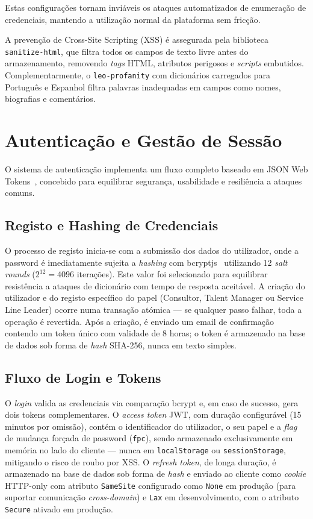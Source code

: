 \documentclass[12pt,a4paper]{report}
\begin{document}
\noindent Estas configurações tornam inviáveis os ataques automatizados de enumeração de credenciais, mantendo a utilização normal da plataforma sem fricção.

A prevenção de Cross-Site Scripting (XSS) é assegurada pela biblioteca \texttt{sanitize-html}, que filtra todos os campos de texto livre antes do armazenamento, removendo \textit{tags} HTML, atributos perigosos e \textit{scripts} embutidos. Complementarmente, o \texttt{leo-profanity} com dicionários carregados para Português e Espanhol filtra palavras inadequadas em campos como nomes, biografias e comentários.

\section{Autenticação e Gestão de Sessão}

O sistema de autenticação implementa um fluxo completo baseado em JSON Web Tokens~\cite{jwt}, concebido para equilibrar segurança, usabilidade e resiliência a ataques comuns.

\subsection{Registo e Hashing de Credenciais}

O processo de registo inicia-se com a submissão dos dados do utilizador, onde a password é imediatamente sujeita a \textit{hashing} com bcryptjs~\cite{bcrypt} utilizando 12 \textit{salt rounds} ($2^{12} = 4096$ iterações). Este valor foi selecionado para equilibrar resistência a ataques de dicionário com tempo de resposta aceitável. A criação do utilizador e do registo específico do papel (Consultor, Talent Manager ou Service Line Leader) ocorre numa transação atómica --- se qualquer passo falhar, toda a operação é revertida. Após a criação, é enviado um email de confirmação contendo um token único com validade de 8 horas; o token é armazenado na base de dados sob forma de \textit{hash} SHA-256, nunca em texto simples.

\subsection{Fluxo de Login e Tokens}

O \textit{login} valida as credenciais via comparação bcrypt e, em caso de sucesso, gera dois tokens complementares. O \textit{access token} JWT, com duração configurável (15 minutos por omissão), contém o identificador do utilizador, o seu papel e a \textit{flag} de mudança forçada de password (\texttt{fpc}), sendo armazenado exclusivamente em memória no lado do cliente --- nunca em \texttt{localStorage} ou \texttt{sessionStorage}, mitigando o risco de roubo por XSS. O \textit{refresh token}, de longa duração, é armazenado na base de dados sob forma de \textit{hash} e enviado ao cliente como \textit{cookie} HTTP-only com atributo \texttt{SameSite} configurado como \texttt{None} em produção (para suportar comunicação \textit{cross-domain}) e \texttt{Lax} em desenvolvimento, com o atributo \texttt{Secure} ativado em produção.
\end{document}
